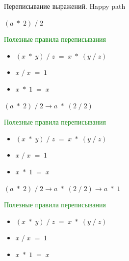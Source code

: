 \documentclass[aspectratio=169
  , xcolor={svgnames}
  , russian  %
  ]{beamer}
\begin{document}
\begin{frame}{Переписывание выражений. Happy path}

{
    \Huge{ \centering
    $(a \; *\; 2)\; / \;2$
    }

    \vspace{1cm} %

    {\fontsize{16.1}{12}\selectfont \textcolor{green}{Полезные правила переписывания}}
    {\fontsize{16.1}{12}\selectfont %
    \begin{itemize}
        \item $(x\; * \;y) \;/ \;z \;= \;x\; * \;(y \;/ \;z)$
        \item $x \; / \; x \; = \; 1$
        \item $x \; * \; 1 \; = \; x$
    \end{itemize}
    }
}

{
    \Huge{ \centering
    $(a \; *\; 2)\; / \;2 \rightarrow a \;*\; (2\; /\; 2)$
    }

    \vspace{1cm} %

    {\fontsize{16.1}{12}\selectfont \textcolor{ForestGreen}{Полезные правила переписывания}}
    {\fontsize{16.1}{12}\selectfont %
    \begin{itemize}
        \item $(x\; * \;y) \;/ \;z \;= \;x\; * \;(y \;/ \;z)$
        \item $x \; / \; x \; = \; 1$
        \item $x \; * \; 1 \; = \; x$
    \end{itemize}
    }
}

{
    \Huge{ \centering
    $(a \; *\; 2)\; / \;2 \rightarrow a \;*\; (2\; /\; 2) \rightarrow a \;*\; 1$
    }

    \vspace{1cm} %

    {\fontsize{16.1}{12}\selectfont \textcolor{ForestGreen}{Полезные правила переписывания}}
    {\fontsize{16.1}{12}\selectfont %
    \begin{itemize}
        \item $(x\; * \;y) \;/ \;z \;= \;x\; * \;(y \;/ \;z)$
        \item $x \; / \; x \; = \; 1$
        \item $x \; * \; 1 \; = \; x$
    \end{itemize}
    }
}


\end{frame}
\end{document}
